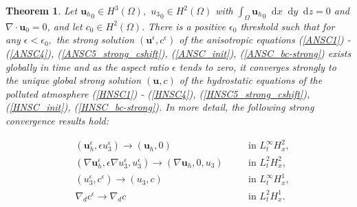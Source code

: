 \documentclass[11pt, a4paper]{article}
\newtheorem{theorem}{Theorem}
\newcommand*\diff{\mathop{}\!\mathrm{d}}
\begin{document}
\begin{theorem} \label{maintheoremSTRONG}
Let ${\mathbf{u}_h}_0 \in H^3(\Omega),$ ${u_3}_0 \in H^2(\Omega)$ with $\int_\Omega {\mathbf{u}_h}_0 \diff x \diff y \diff z = 0$ and $\nabla \cdot \mathbf{u}_0 = 0$, and let $c_0 \in H^2 (\Omega).$ There is a positive $\epsilon_0$ threshold such that for any $\epsilon < \epsilon_0,$ the strong solution $(\mathbf{u}^\epsilon, c^\epsilon)$ of the anisotropic equations (\ref{ANSC1}) - (\ref{ANSC4}), (\ref{ANSC5_strong_cshift}), (\ref{ANSC_init}), (\ref{ANSC_bc-strong}) exists globally in time and as the aspect ratio $\epsilon$ tends to zero, it converges strongly to the unique global strong solution $(\mathbf{u}, c)$ of the hydrostatic equations of the polluted atmosphere (\ref{HNSC1}) - (\ref{HNSC4}), (\ref{HNSC5_strong_cshift}), (\ref{HNSC_init}), (\ref{HNSC_bc-strong}). In more detail, the following strong convergence results hold:

\begin{align} 
& (\mathbf{u}_h^\epsilon, \epsilon u_3^\epsilon) \to (\mathbf{u}_h, 0) &\quad & \text{in $L_t^\infty H_x^2$,} \label{StrongConvVelocity1statement} \\
& (\nabla \mathbf{u}_h^\epsilon, \epsilon \nabla u_3^\epsilon, u_3^\epsilon) \to (\nabla \mathbf{u}_h, 0, u_3) &\quad & \text{in $L_t^2 H_x^2$,} \label{StrongConvVelocity2statement} \\ 
& (u_3^\epsilon, c^\epsilon) \to (u_3, c) &\quad & \text{in $L_t^\infty H_x^1,$} \label{StrongConvVelocity3andConcentrationstatement} \\
& \nabla_d c^\epsilon \to \nabla_d c &\quad & \text{in $L_t^2 H_x^1.$} \label{StrongConvConcentrationstatement}
\end{align}

\end{theorem}
\end{document}
